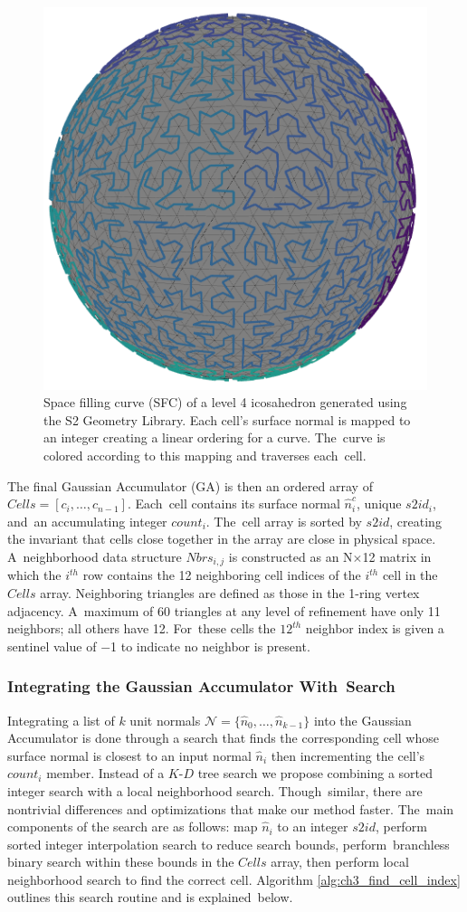 \begin{figure}[H]
    \centering
    \includegraphics[width=.20\linewidth]{chapter_3_polylidar3d/imgs/fastga_ico_hilbert_v3.png}
    \caption[Space filling curve (SFC) of a level four refined icosahedron]{Space filling curve (SFC) of a level 4 icosahedron generated using the S2 Geometry Library. Each cell's surface normal is mapped to an integer creating a linear ordering for a curve. The~curve is colored according to this mapping and traverses each~cell.   }
    \label{fig:ch3_fastga_hilbert}
\end{figure}

The final Gaussian Accumulator (GA) is then an ordered array of $Cells = [ c_i, \ldots, c_{n-1}] $. Each~cell contains its surface normal $\hat{n}^{c}_{i}$, unique $s2id_i$, and~an accumulating integer $count_i$. The~cell array is sorted by $s2id$, creating the invariant that cells close together in the array are close in physical space. A~neighborhood data structure $Nbrs_{i,j}$ is constructed as an N$\times$12 matrix in which the $i^{th}$ row contains the 12 neighboring cell indices of the $i^{th}$ cell in the $Cells$ array. Neighboring triangles are defined as those in the 1-ring vertex adjacency. A~maximum of 60 triangles at any level of refinement have only 11 neighbors; all others have 12. For~these cells the $12^{th}$ neighbor index is given a sentinel value of $-$1 to indicate no neighbor is present. 

\subsubsection{Integrating the Gaussian Accumulator With~Search}\label{sec:ch3_methods_fastga_search}
Integrating a list of $k$ unit normals $\mathcal{N} = \{\hat{n}_0, \ldots, \hat{n}_{k-1} \}$ into the Gaussian Accumulator is done through a search that finds the corresponding cell whose surface normal is closest to an input normal $\hat{n}_i$ then incrementing the cell's $count_i$ member.
Instead of a $K$-$D$ tree search we propose combining a sorted integer search with a local neighborhood search. Though~similar, there are nontrivial differences and optimizations that make our method faster.  The~main components of the search are as follows: map $\hat{n}_i$ to an integer $s2id$, perform sorted integer interpolation search to reduce search bounds, perform~branchless binary search within these bounds in the $Cells$ array, then  perform local neighborhood search to find the correct cell. Algorithm \ref{alg:ch3_find_cell_index} outlines this search routine and is explained~below.

